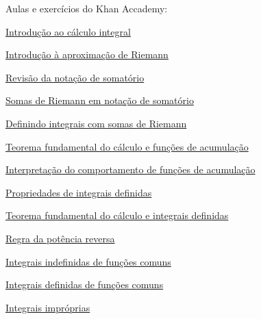 Aulas e exercícios do Khan Accademy:
\begin{listlinks}
  \item \href{https://pt.khanacademy.org/math/integral-calculus/ic-integration/ic-integral-calc-intro/v/introduction-to-integral-calculus}{Introdução ao cálculo integral}
  \item \href{https://pt.khanacademy.org/math/integral-calculus/ic-integration/ic-riemann-sums/v/simple-riemann-approximation-using-rectangles}{Introdução à aproximação de Riemann}
  \item \href{https://pt.khanacademy.org/math/integral-calculus/ic-integration/ic-summation-notation/v/sigma-notation-sum}{Revisão da notação de somatório}
  \item \href{https://pt.khanacademy.org/math/integral-calculus/ic-integration/ic-riemann-sums-summation-notation/v/generalizing-a-left-riemann-sum-with-equally-spaced-rectangles}{Somas de Riemann em notação de somatório}
  \item \href{https://pt.khanacademy.org/math/integral-calculus/ic-integration/ic-definite-integral-definition/v/riemann-sums-and-integrals}{Definindo integrais com somas de Riemann}
  \item \href{https://pt.khanacademy.org/math/integral-calculus/ic-integration/ic-ftc-part-1/v/fundamental-theorem-of-calculus}{Teorema fundamental do cálculo e funções de acumulação}
  \item \href{https://pt.khanacademy.org/math/integral-calculus/ic-integration/ic-connect-function-antiderivative/v/interpreting-behavior-of-antiderivative}{Interpretação do comportamento de funções de acumulação}
  \item \href{https://pt.khanacademy.org/math/integral-calculus/ic-integration/ic-integral-prop/v/negative-definite-integrals}{Propriedades de integrais definidas}
  \item \href{https://pt.khanacademy.org/math/integral-calculus/ic-integration/ic-ftc-part-2/v/connecting-the-first-and-second-fundamental-theorems-of-calculus}{Teorema fundamental do cálculo e integrais definidas}
  \item \href{https://pt.khanacademy.org/math/integral-calculus/ic-integration/ic-reverse-power-rule/v/indefinite-integrals-of-x-raised-to-a-power}{Regra da potência reversa}
  \item \href{https://pt.khanacademy.org/math/integral-calculus/ic-integration/ic-common-indefinite-integrals/v/antiderivative-of-x-1}{Integrais indefinidas de funções comuns}
  \item \href{https://pt.khanacademy.org/math/integral-calculus/ic-integration/ic-common-definite-integrals/v/reverse-power-rule-for-definite-integrals}{Integrais definidas de funções comuns}
  \item \href{https://pt.khanacademy.org/math/integral-calculus/ic-integration/ic-improper-integrals/v/introduction-to-improper-integrals}{Integrais impróprias}
\end{listlinks}

